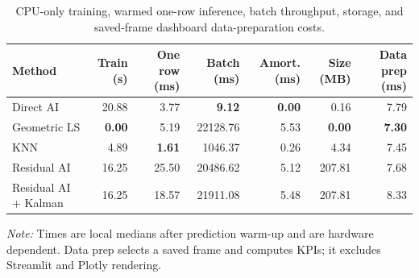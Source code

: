 \begin{table}[t]
\centering
\caption{CPU-only training, warmed one-row inference, batch throughput, storage, and saved-frame dashboard data-preparation costs.}
\label{tab:runtime}
\small
\begin{tabular}{lrrrrrr}
\toprule
Method & Train (s) & One row (ms) & Batch (ms) & Amort. (ms) & Size (MB) & Data prep (ms) \\
\midrule
Direct AI & 20.88 & 3.77 & \textbf{9.12} & \textbf{0.00} & 0.16 & 7.79 \\
Geometric LS & \textbf{0.00} & 5.19 & 22128.76 & 5.53 & \textbf{0.00} & \textbf{7.30} \\
KNN & 4.89 & \textbf{1.61} & 1046.37 & 0.26 & 4.34 & 7.45 \\
Residual AI & 16.25 & 25.50 & 20486.62 & 5.12 & 207.81 & 7.68 \\
Residual AI + Kalman & 16.25 & 18.57 & 21911.08 & 5.48 & 207.81 & 8.33 \\
\bottomrule
\end{tabular}
\par\smallskip\footnotesize\textit{Note:} Times are local medians after prediction warm-up and are hardware dependent. Data prep selects a saved frame and computes KPIs; it excludes Streamlit and Plotly rendering.
\end{table}
